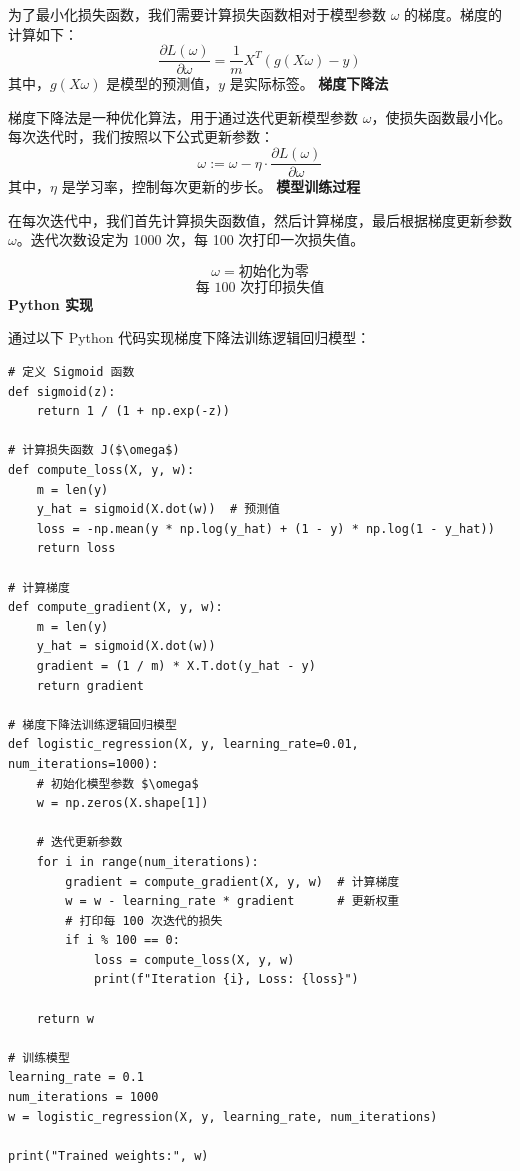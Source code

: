 \documentclass[12pt,a4paper,oneside]{article}
\begin{document}
    为了最小化损失函数，我们需要计算损失函数相对于模型参数 $\omega$ 的梯度。梯度的计算如下：
    \[
    \frac{\partial L(\omega)}{\partial \omega} = \frac{1}{m} X^T (g(X \omega) - y)
    \]
    其中，$g(X \omega)$ 是模型的预测值，$y$ 是实际标签。
    \newline\textbf{梯度下降法}

    梯度下降法是一种优化算法，用于通过迭代更新模型参数 $\omega$，使损失函数最小化。每次迭代时，我们按照以下公式更新参数：
    \[
    \omega := \omega - \eta \cdot \frac{\partial L(\omega)}{\partial \omega}
    \]
    其中，$\eta$ 是学习率，控制每次更新的步长。
    \newline\textbf{模型训练过程}

    在每次迭代中，我们首先计算损失函数值，然后计算梯度，最后根据梯度更新参数 $\omega$。迭代次数设定为 1000 次，每 100 次打印一次损失值。
    
    \[
    \omega = \text{初始化为零}
    \]
    \[
    \text{每 100 次打印损失值}
    \]
    \newline\textbf{Python 实现}
      
    通过以下 Python 代码实现梯度下降法训练逻辑回归模型：
    
    \begin{lstlisting}  
# 定义 Sigmoid 函数
def sigmoid(z):
    return 1 / (1 + np.exp(-z))

# 计算损失函数 J($\omega$)
def compute_loss(X, y, w):
    m = len(y)
    y_hat = sigmoid(X.dot(w))  # 预测值
    loss = -np.mean(y * np.log(y_hat) + (1 - y) * np.log(1 - y_hat))
    return loss

# 计算梯度
def compute_gradient(X, y, w):
    m = len(y)
    y_hat = sigmoid(X.dot(w))
    gradient = (1 / m) * X.T.dot(y_hat - y)
    return gradient

# 梯度下降法训练逻辑回归模型
def logistic_regression(X, y, learning_rate=0.01, num_iterations=1000):
    # 初始化模型参数 $\omega$
    w = np.zeros(X.shape[1])

    # 迭代更新参数
    for i in range(num_iterations):
        gradient = compute_gradient(X, y, w)  # 计算梯度
        w = w - learning_rate * gradient      # 更新权重
        # 打印每 100 次迭代的损失
        if i % 100 == 0:
            loss = compute_loss(X, y, w)
            print(f"Iteration {i}, Loss: {loss}")

    return w

# 训练模型
learning_rate = 0.1
num_iterations = 1000
w = logistic_regression(X, y, learning_rate, num_iterations)

print("Trained weights:", w)

    \end{lstlisting}
    
\end{document}
